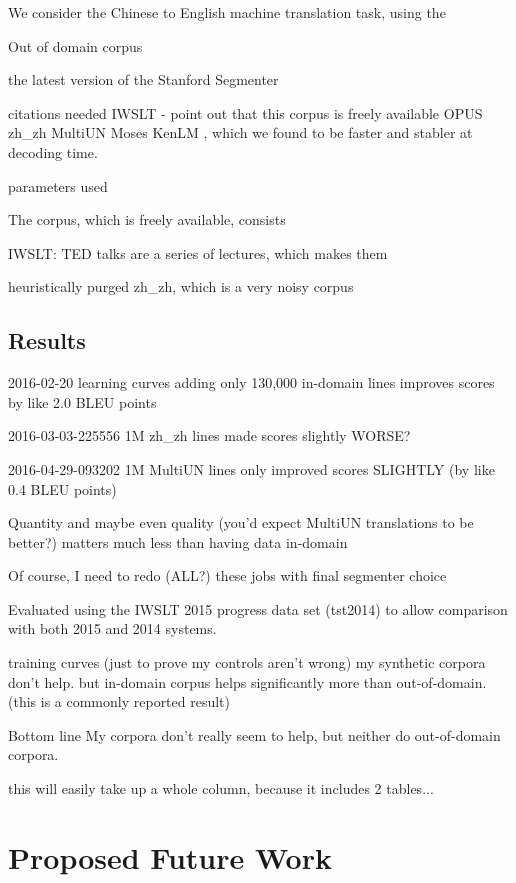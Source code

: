 We consider the Chinese to English machine translation task, using the 

Out of domain corpus

the latest version of the Stanford Segmenter 

citations needed
IWSLT  - point out that this corpus is freely available
OPUS zh\_zh  MultiUN 
Moses 
KenLM , which we found to be faster and stabler at decoding time.

parameters used

The corpus, which is freely available, consists 

IWSLT: TED talks are a series of lectures, which makes them 



heuristically purged zh\_zh, which is a very noisy corpus

\subsection{Results}

2016-02-20 learning curves adding only 130,000 in-domain lines improves scores by like 2.0 BLEU points

2016-03-03-225556 1M zh\_zh lines made scores slightly WORSE?

2016-04-29-093202 1M MultiUN lines only improved scores SLIGHTLY (by like 0.4 BLEU points)

Quantity and maybe even quality (you'd expect MultiUN translations to be better?) matters much less than having data in-domain

Of course, I need to redo (ALL?) these jobs with final segmenter choice

Evaluated using the IWSLT 2015 progress data set (tst2014) to allow comparison with both 2015 and 2014 systems.

training curves (just to prove my controls aren't wrong)
my synthetic corpora don't help. 
but in-domain corpus helps significantly more than out-of-domain. (this is a commonly reported result)

Bottom line
My corpora don't really seem to help, but neither do out-of-domain corpora.

this will easily take up a whole column, because it includes 2 tables...

\section{Proposed Future Work}

